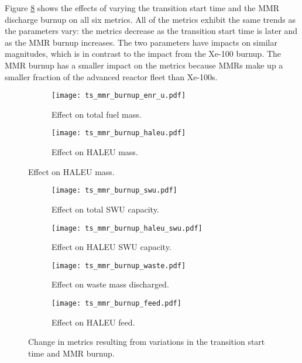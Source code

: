 Figure \ref{fig:ts_mmr_bu} shows the effects of varying the transition 
start time and the \gls{MMR} discharge burnup on all six metrics. All 
of the metrics exhibit the same trends as the parameters vary: the 
metrics decrease as the transition start time is later and as the 
\gls{MMR} burnup increases. The two parameters have impacts on similar 
magnitudes, which is in contrast to the impact from the Xe-100 burnup. The 
\gls{MMR} burnup has a smaller impact on the metrics because \glspl{MMR} 
make up a smaller fraction of the advanced reactor fleet than Xe-100s. 

\begin{figure}
    \begin{subfigure}[t]{0.48\textwidth}
        \centering
        \texttt{[image: ts\_mmr\_burnup\_enr\_u.pdf]}
        \caption{Effect on total fuel mass.}
        \label{fig:ts_mmr_bu_enr_u}
    \end{subfigure}
    \hfill
    \begin{subfigure}[t]{0.48\textwidth}
        \centering
        \texttt{[image: ts\_mmr\_burnup\_haleu.pdf]}
        \caption{Effect on HALEU mass.}
        \label{fig:ts_mmr_bu_haleu}
    \end{subfigure}
\end{figure}

\begin{figure}
    \ContinuedFloat    
    \begin{subfigure}[t]{0.48\textwidth}
        \centering
        \texttt{[image: ts\_mmr\_burnup\_swu.pdf]}
        \caption{Effect on total SWU capacity.}
        \label{fig:ts_mmr_bu_swu}
    \end{subfigure}
    \hfill
    \begin{subfigure}[t]{0.48\textwidth}
        \centering
        \texttt{[image: ts\_mmr\_burnup\_haleu\_swu.pdf]}
        \caption{Effect on HALEU SWU capacity.}
        \label{fig:ts_mmr_bu_haleu_swu}
    \end{subfigure}
    
    \begin{subfigure}[t]{0.48\textwidth}
        \centering
        \texttt{[image: ts\_mmr\_burnup\_waste.pdf]}
        \caption{Effect on waste mass discharged.}
        \label{fig:ts_mmr_bu_waste}
    \end{subfigure}
    \hfill
    \begin{subfigure}[t]{0.48\textwidth}
        \centering
        \texttt{[image: ts\_mmr\_burnup\_feed.pdf]}
        \caption{Effect on HALEU feed.}
        \label{fig:ts_mmr_bu_feed}
    \end{subfigure}
    \caption{Change in metrics resulting from variations in the 
    transition start time and MMR burnup.}
    \label{fig:ts_mmr_bu}
\end{figure}

